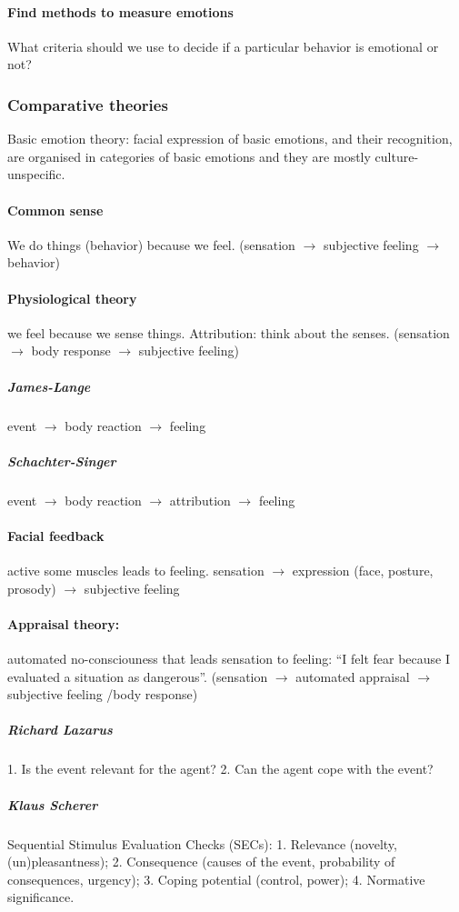 \documentclass[12pt,article,oneside,a4paper]{memoir}
\begin{document}
\paragraph{Find methods to measure emotions}
What criteria should we use to decide if a particular behavior is emotional or not?

\subsubsection{Comparative theories}
Basic emotion theory: facial expression of basic emotions, and their recognition, 
are organised in categories of basic emotions and they are mostly culture-unspecific.

\paragraph{Common sense}
We do things (behavior) because we feel.
(sensation $\rightarrow$ subjective feeling $\rightarrow$ behavior)
\paragraph{Physiological theory}
we feel because we sense things. Attribution: think about the senses.
(sensation $\rightarrow$ body response $\rightarrow$ subjective feeling)
\subparagraph{James-Lange} event $\rightarrow$ body reaction $\rightarrow$ feeling
\subparagraph{Schachter-Singer} event $\rightarrow$ body reaction $\rightarrow$
attribution $\rightarrow$ feeling
\paragraph{Facial feedback} active some muscles leads to feeling. sensation
$\rightarrow$ expression (face, posture, prosody) $\rightarrow$ subjective feeling
\paragraph{Appraisal theory:} automated no-consciouness that leads sensation to
feeling: ``I felt fear because I evaluated a situation as dangerous''.
(sensation $\rightarrow$ automated appraisal $\rightarrow$ subjective feeling
/body response)
\subparagraph{Richard Lazarus} 1. Is the event relevant for the agent? 2.
Can the agent cope with the event?
\subparagraph{Klaus Scherer} Sequential Stimulus Evaluation Checks (SECs):
1. Relevance (novelty, (un)pleasantness); 2. Consequence (causes of the event,
probability of consequences, urgency); 3. Coping potential (control, power);
4. Normative significance.
\end{document}
